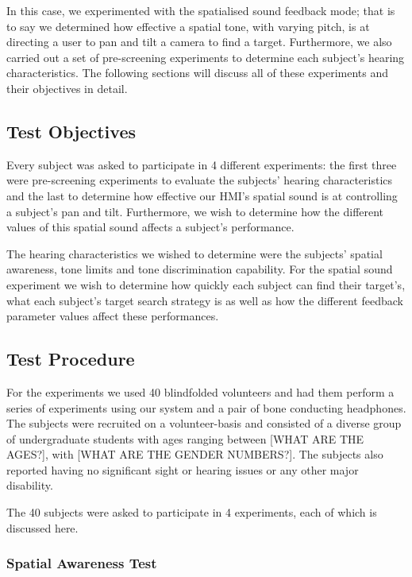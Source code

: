 \documentclass[format=sigconf, review=true, screen=true, anonymous=true]{acmart}
\begin{document}
In this case, we experimented with the spatialised sound feedback mode; that is to say we determined how effective a spatial tone, with varying pitch, is at directing a user to pan and tilt a camera to find a target. Furthermore, we also carried out a set of pre-screening experiments to determine each subject's hearing characteristics. The following sections will discuss all of these experiments and their objectives in detail. 

\subsection{Test Objectives}

Every subject was asked to participate in 4 different experiments: the first three were pre-screening experiments to evaluate the subjects' hearing characteristics and the last to determine how effective our HMI's spatial sound is at controlling a subject's pan and tilt. Furthermore, we wish to determine how the different values of this spatial sound affects a subject's performance. 

The hearing characteristics we wished to determine were the subjects' spatial awareness, tone limits and tone discrimination capability. For the spatial sound experiment we wish to determine how quickly each subject can find their target's, what each subject's target search strategy is as well as how the different feedback parameter values affect these performances. 

\subsection{Test Procedure}

For the experiments we used 40 blindfolded volunteers and had them perform a series of experiments using our system and a pair of bone conducting headphones. The subjects were recruited on a volunteer-basis and consisted of a diverse group of undergraduate students with ages ranging between [WHAT ARE THE AGES?], with [WHAT ARE THE GENDER NUMBERS?]. The subjects also reported having no significant sight or hearing issues or any other major disability. 

The 40 subjects were asked to participate in 4 experiments, each of which is discussed here.

\subsubsection{Spatial Awareness Test}
\end{document}
